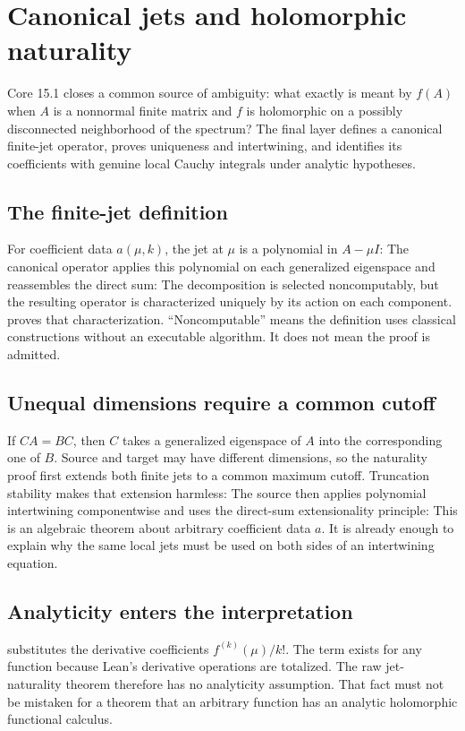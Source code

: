 \clearpage\section{Canonical jets and holomorphic naturality}
\label{sec:holomorphic}
Core 15.1 closes a common source of ambiguity: what exactly is meant by $f(A)$ when $A$ is a nonnormal finite matrix and $f$ is holomorphic on a possibly disconnected neighborhood of the spectrum? The final layer defines a canonical finite-jet operator, proves uniqueness and intertwining, and identifies its coefficients with genuine local Cauchy integrals under analytic hypotheses.

\subsection{The finite-jet definition}
For coefficient data $a(\mu,k)$, the jet at $\mu$ is a polynomial in $A-\mu I$:
The canonical operator applies this polynomial on each generalized eigenspace and reassembles the direct sum:
The decomposition is selected noncomputably, but the resulting operator is characterized uniquely by its action on each component.  proves that characterization. ``Noncomputable'' means the definition uses classical constructions without an executable algorithm. It does not mean the proof is admitted.

\subsection{Unequal dimensions require a common cutoff}
If $CA=BC$, then $C$ takes a generalized eigenspace of $A$ into the corresponding one of $B$. Source and target may have different dimensions, so the naturality proof first extends both finite jets to a common maximum cutoff. Truncation stability makes that extension harmless:
The source then applies polynomial intertwining componentwise and uses the direct-sum extensionality principle:
This is an algebraic theorem about arbitrary coefficient data $a$. It is already enough to explain why the same local jets must be used on both sides of an intertwining equation.

\subsection{Analyticity enters the interpretation}
 substitutes the derivative coefficients $f^{(k)}(\mu)/k!$. The term exists for any function because Lean's derivative operations are totalized. The raw jet-naturality theorem therefore has no analyticity assumption. That fact must not be mistaken for a theorem that an arbitrary function has an analytic holomorphic functional calculus.

